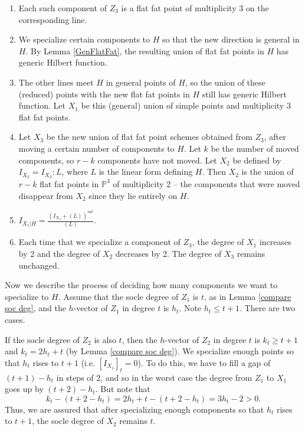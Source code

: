 \documentclass[12pt]{amsart}%
\numberwithin{equation}{section}
\theoremstyle{definition}
\numberwithin{equation}{section}
\newcounter{step}
\renewcommand{\labelenumi}{\arabic{enumi}.  }
\begin{document}
\renewcommand{\theenumi}{\roman{enumi}}
\renewcommand{\labelenumi}{(\theenumi)}

\begin{enumerate}
    \item Each such component of $Z_3$ is a flat fat point of multiplicity 3 on the corresponding line.

    \item We specialize certain components to $H$ so that the new direction is general in $H$. By 
Lemma \ref{GenFlatFat}, the resulting union of flat fat points in $H$ has generic Hilbert function. 

\item The other lines meet $H$ in general points of $H$, so the union of these (reduced) points with the new flat fat points in $H$ still has generic Hilbert function. Let $X_1$ be this (general) union of simple points and multiplicity 3 flat fat points.

\item \label{obs4} Let $X_3$ be the new union of flat fat point schemes {obtained from $Z_3$}, after moving a certain number of components to $H$. Let $k$ be the number of moved components, so $r-k$ components have not moved. Let $X_2$ be defined by $I_{X_2} = I_{X_3} : L$, where $L$ is the linear form defining $H$. Then $X_2$ is the union of $r-k$ flat fat points in $\mathbb P^3$ of multiplicity 2 -- the components that were moved disappear from $X_2$ since they lie entirely on $H$.

\item $I_{X_1|H} = \frac{{(I_{X_3} + (L))^{sat}}}{(L)}. $

\item Each time that we specialize a component {of $Z_3$}, the degree of $X_1$ increases by 2 and the degree of $X_2$ decreases by 2. The degree of $X_3$ remains unchanged.
\end{enumerate}



Now we describe the process of deciding how many components we want to specialize to $H$. Assume that the socle degree of $Z_1$ is $t$, as in Lemma \ref{compare soc deg}, and the $h$-vector of $Z_1$ in degree $t$ is $h_t$. Note $h_t \leq t+1$. There are two cases.

\vspace{.2in}

  If the socle degree of $Z_2$ is also $t$, then the $h$-vector of $Z_2$ in degree $t$ is $k_t \geq t+1$ and $k_t = 2h_t + t$ (by Lemma \ref{compare soc deg}). We specialize enough points so that $h_t$ rises to $t+1$ (i.e. $[I_{X_1}]_t = 0$). To do this, we have to fill a gap of $(t+1) - h_t$ in steps of 2, and so in the worst case the degree from $Z_1$ to $X_1$ goes up by $(t+2) - h_t$. But note that
\[
k_t - (t+2-h_t) = 2h_t + t - (t+2-h_t) = 3h_t-2 > 0. 
\]
Thus, we are assured that after specializing enough components so that $h_t$ rises to $t+1$, the socle degree of $X_2$ remains $t$.
\end{document}

